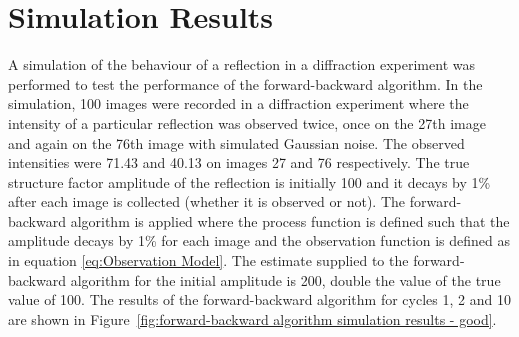 \section{Simulation Results}
\label{sec:Simulation Results}
A simulation of the behaviour of a reflection in a diffraction experiment was performed to test the performance of the forward-backward algorithm.
In the simulation, 100 images were recorded in a diffraction experiment where the intensity of a particular reflection was observed twice, once on the 27th image and again on the 76th image with simulated Gaussian noise.
The observed intensities were 71.43 and 40.13 on images 27 and 76 respectively.
The true structure factor amplitude of the reflection is initially 100 and it decays by 1\% after each image is collected (whether it is observed or not).
The forward-backward algorithm is applied where the process function is defined such that the amplitude decays by 1\% for each image and the observation function is defined as in equation \ref{eq:Observation Model}.
The estimate supplied to the forward-backward algorithm for the initial amplitude is 200, double the value of the true value of 100.
The results of the forward-backward algorithm for cycles 1, 2 and 10 are shown in Figure~\ref{fig:forward-backward algorithm simulation results - good}.
